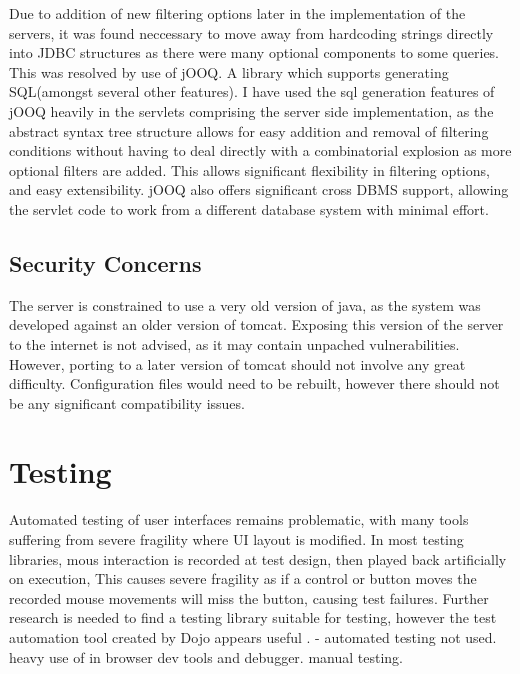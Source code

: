 Due to addition of new filtering options later in the implementation of the servers, it was found neccessary to move away from hardcoding strings directly into JDBC structures
as there were many optional components to some queries. This was resolved by use of jOOQ. A library which supports generating SQL(amongst several other features). I have used the sql generation features of jOOQ heavily in the servlets comprising the server side implementation, as the abstract syntax tree structure allows for easy addition and removal of filtering conditions without having to deal directly with a combinatorial explosion as more optional filters are added. This allows significant flexibility in filtering options, and easy extensibility. jOOQ also offers significant cross DBMS support, allowing the servlet code to work from a different database system with minimal effort.


\subsection{Security Concerns}
The server is constrained to use a very old version of java, as the system was developed against an older version of tomcat. Exposing this version of the server to the internet is not advised, as it may contain unpached vulnerabilities. However, porting to a later version of tomcat should not involve any great difficulty.  Configuration files would need to be rebuilt, however there should not be any significant compatibility issues.

\section{Testing}
Automated testing of user interfaces remains problematic, with many tools suffering from severe fragility where UI layout is modified. In most testing libraries, mous interaction is recorded at test design, then played back artificially on execution, This causes severe fragility as if a control or button moves the recorded mouse movements will miss the button, causing test failures. Further research is needed to find a testing library suitable for testing, however the test automation tool created by Dojo appears useful \cite{dojo2013test}. - automated testing not used. heavy use of in browser dev tools and debugger. manual testing. 
